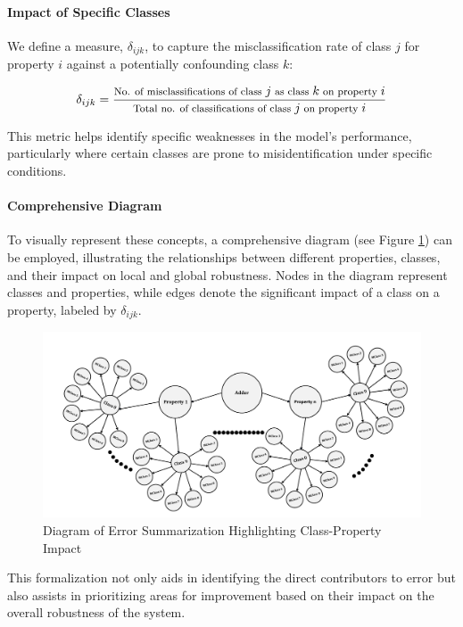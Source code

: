 \documentclass[10pt, conference, a4paper, final]{IEEEtran}
\begin{document}
\paragraph{Impact of Specific Classes}
We define a measure, \( \delta_{ijk} \), to capture the misclassification rate of class \( j \) for property \( i \) against a potentially confounding class \( k \):

\begin{equation}
    {\footnotesize
    \delta_{ijk} = \frac{\text{No. of misclassifications of class } j \text{ as class } k \text{ on property } i}{\text{Total no. of classifications of class } j \text{ on property } i}
    }
\end{equation}

This metric helps identify specific weaknesses in the model’s performance, particularly where certain classes are prone to misidentification under specific conditions.

\paragraph{Comprehensive Diagram}
To visually represent these concepts, a comprehensive diagram (see Figure \ref{fig:error-summarization}) can be employed, illustrating the relationships between different properties, classes, and their impact on local and global robustness. Nodes in the diagram represent classes and properties, while edges denote the significant impact of a class on a property, labeled by \( \delta_{ijk} \).

\begin{figure}[H]
    \centering
    \includegraphics[width=\linewidth]{paper_images/step4.pdf}
    \caption{Diagram of Error Summarization Highlighting Class-Property Impact}
    \label{fig:error-summarization}
\end{figure}

This formalization not only aids in identifying the direct contributors to error but also assists in prioritizing areas for improvement based on their impact on the overall robustness of the system.
\end{document}
